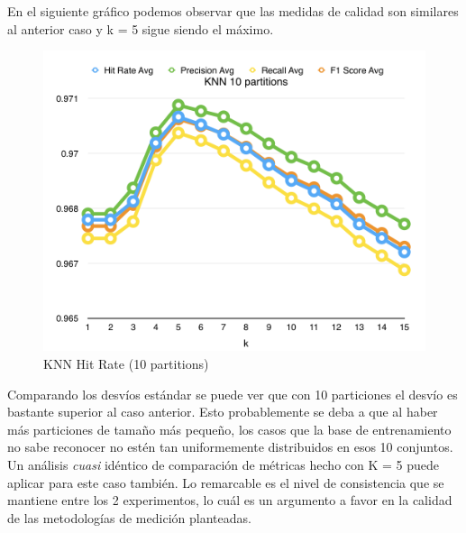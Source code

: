 En el siguiente gráfico podemos observar que las medidas de calidad son similares al anterior caso y k = 5 sigue siendo el máximo.\\

\newpage

\begin{figure}[h!]
  \begin{center}
	\includegraphics[scale=0.7]{exp1/KNN-10p-Scores.png}
	\caption{KNN Hit Rate (10 partitions)}
  \end{center}
\end{figure}

Comparando los desvíos estándar se puede ver que con 10 particiones el desvío es bastante superior al caso anterior. Esto probablemente se deba a que al haber más particiones de tamaño más pequeño, los casos que la base de entrenamiento no sabe reconocer no estén tan uniformemente distribuidos en esos 10 conjuntos. Un an\'alisis \textit{cuasi} id\'entico de comparaci\'on de m\'etricas hecho con K = 5 puede aplicar para este caso tambi\'en. Lo remarcable es el nivel de consistencia que se mantiene entre los 2 experimentos, lo cu\'al es un argumento a favor en la calidad de las metodolog\'ias de medici\'on planteadas. \\ 

